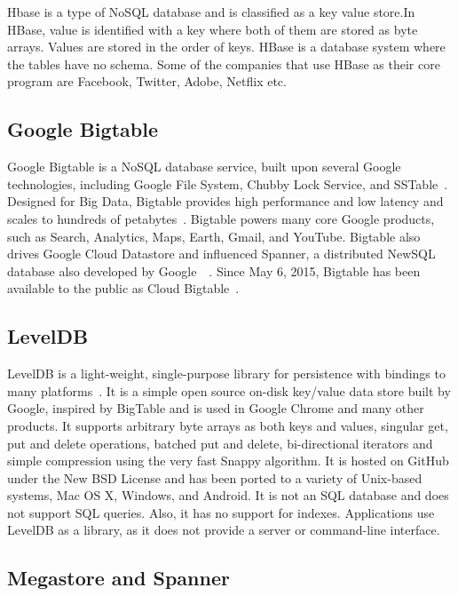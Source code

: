      Hbase is a type of NoSQL database and is classified as a key
     value store.In HBase, value is identified with a key where both of
     them are stored as byte arrays. Values are stored in the order of
     keys. HBase is a database system where the tables have no
     schema. Some of the companies that use HBase as their core
     program are Facebook, Twitter, Adobe, Netflix etc.

     \pv

\subsection{Google Bigtable}

Google Bigtable is a NoSQL database service, built upon several Google
technologies, including Google File System, Chubby Lock Service, and
SSTable~\cite{www-cloudbigtable}.  Designed for Big Data, Bigtable
provides high performance and low latency and scales to hundreds of
petabytes~\cite{www-cloudbigtable}. Bigtable powers many core Google
products, such as Search, Analytics, Maps, Earth, Gmail, and
YouTube. Bigtable also drives Google Cloud Datastore and influenced
Spanner, a distributed NewSQL database also developed by
Google~\cite{www-wikispanner}~\cite{www-wikibigtable}.  Since May 6,
2015, Bigtable has been available to the public as Cloud
Bigtable~\cite{www-wikibigtable}.

\subsection{LevelDB}

LevelDB is a light-weight, single-purpose library for persistence with
bindings to many platforms~\cite{www-leveldb}. It is a simple open
source on-disk key/value data store built by Google, inspired by
BigTable and is used in Google Chrome and many other products. It
supports arbitrary byte arrays as both keys and values, singular get,
put and delete operations, batched put and delete, bi-directional
iterators and simple compression using the very fast Snappy
algorithm. It is hosted on GitHub under the New BSD License and has
been ported to a variety of Unix-based systems, Mac OS X, Windows, and
Android. It is not an SQL database and does not support SQL
queries. Also, it has no support for indexes. Applications use LevelDB
as a library, as it does not provide a server or command-line
interface.

     \pv

\subsection{Megastore and Spanner}

